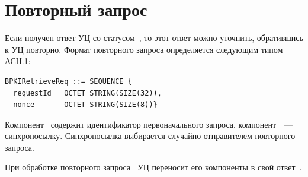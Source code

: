 \section{Повторный запрос}\label{FMT.BPKIRetrieveReq}

Если получен ответ УЦ со статусом~, то этот ответ можно 
уточнить, обратившись к УЦ повторно. Формат повторного запроса 
определяется следующим типом АСН.1:
\begin{verbatim}
BPKIRetrieveReq ::= SEQUENCE { 
  requestId   OCTET STRING(SIZE(32)),
  nonce       OCTET STRING(SIZE(8))}
\end{verbatim}

Компонент~ содержит идентификатор первоначального 
запроса, компонент~~--- синхропосылку. Синхропосылка 
выбирается случайно отправителем повторного запроса. 

При обработке повторного запроса~ УЦ
переносит его компоненты в свой ответ~.


